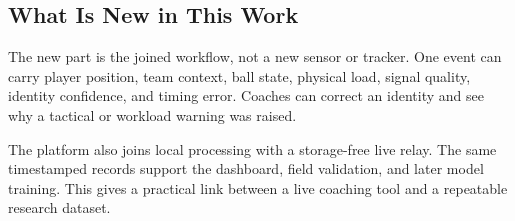 \subsection{What Is New in This Work}
The new part is the joined workflow, not a new sensor or tracker. One event can
carry player position, team context, ball state, physical load, signal quality,
identity confidence, and timing error. Coaches can correct an identity and see
why a tactical or workload warning was raised.

The platform also joins local processing with a storage-free live relay. The
same timestamped records support the dashboard, field validation, and later
model training. This gives a practical link between a live coaching tool and a
repeatable research dataset.
